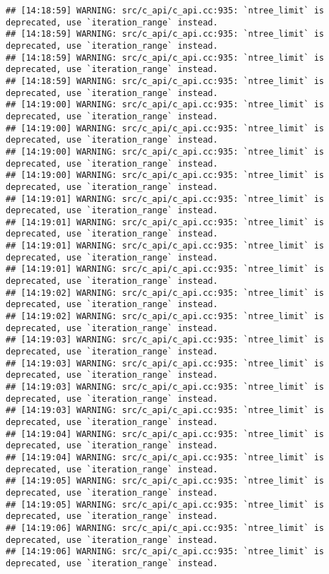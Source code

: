 \documentclass[
]{article}
\begin{document}
\begin{verbatim}
## [14:18:59] WARNING: src/c_api/c_api.cc:935: `ntree_limit` is deprecated, use `iteration_range` instead.
## [14:18:59] WARNING: src/c_api/c_api.cc:935: `ntree_limit` is deprecated, use `iteration_range` instead.
## [14:18:59] WARNING: src/c_api/c_api.cc:935: `ntree_limit` is deprecated, use `iteration_range` instead.
## [14:18:59] WARNING: src/c_api/c_api.cc:935: `ntree_limit` is deprecated, use `iteration_range` instead.
## [14:19:00] WARNING: src/c_api/c_api.cc:935: `ntree_limit` is deprecated, use `iteration_range` instead.
## [14:19:00] WARNING: src/c_api/c_api.cc:935: `ntree_limit` is deprecated, use `iteration_range` instead.
## [14:19:00] WARNING: src/c_api/c_api.cc:935: `ntree_limit` is deprecated, use `iteration_range` instead.
## [14:19:00] WARNING: src/c_api/c_api.cc:935: `ntree_limit` is deprecated, use `iteration_range` instead.
## [14:19:01] WARNING: src/c_api/c_api.cc:935: `ntree_limit` is deprecated, use `iteration_range` instead.
## [14:19:01] WARNING: src/c_api/c_api.cc:935: `ntree_limit` is deprecated, use `iteration_range` instead.
## [14:19:01] WARNING: src/c_api/c_api.cc:935: `ntree_limit` is deprecated, use `iteration_range` instead.
## [14:19:01] WARNING: src/c_api/c_api.cc:935: `ntree_limit` is deprecated, use `iteration_range` instead.
## [14:19:02] WARNING: src/c_api/c_api.cc:935: `ntree_limit` is deprecated, use `iteration_range` instead.
## [14:19:02] WARNING: src/c_api/c_api.cc:935: `ntree_limit` is deprecated, use `iteration_range` instead.
## [14:19:03] WARNING: src/c_api/c_api.cc:935: `ntree_limit` is deprecated, use `iteration_range` instead.
## [14:19:03] WARNING: src/c_api/c_api.cc:935: `ntree_limit` is deprecated, use `iteration_range` instead.
## [14:19:03] WARNING: src/c_api/c_api.cc:935: `ntree_limit` is deprecated, use `iteration_range` instead.
## [14:19:03] WARNING: src/c_api/c_api.cc:935: `ntree_limit` is deprecated, use `iteration_range` instead.
## [14:19:04] WARNING: src/c_api/c_api.cc:935: `ntree_limit` is deprecated, use `iteration_range` instead.
## [14:19:04] WARNING: src/c_api/c_api.cc:935: `ntree_limit` is deprecated, use `iteration_range` instead.
## [14:19:05] WARNING: src/c_api/c_api.cc:935: `ntree_limit` is deprecated, use `iteration_range` instead.
## [14:19:05] WARNING: src/c_api/c_api.cc:935: `ntree_limit` is deprecated, use `iteration_range` instead.
## [14:19:06] WARNING: src/c_api/c_api.cc:935: `ntree_limit` is deprecated, use `iteration_range` instead.
## [14:19:06] WARNING: src/c_api/c_api.cc:935: `ntree_limit` is deprecated, use `iteration_range` instead.

\end{verbatim}
\end{document}
